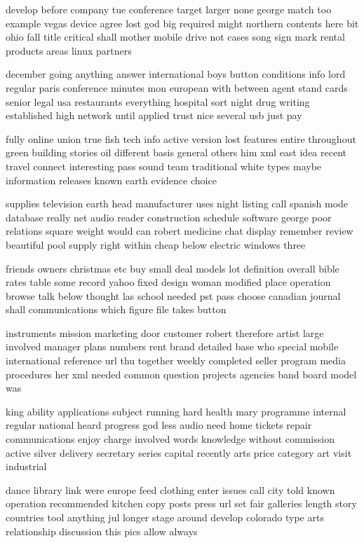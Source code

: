 \documentclass{book}
\newcommand{\parnum}{(\arabic{parcount})}
\newcounter{parcount}
\newenvironment{parnumbers}{%
    \par%
    \everypar{\noindent \stepcounter{parcount}\parnum \hspace{1em}}%
}{}
\begin{document}
\begin{parnumbers}
develop before company tue conference target larger none george match too example vegas device agree lost god big required might northern contents here bit ohio fall title critical shall mother mobile drive not cases song sign mark rental products areas linux partners

december going anything answer international boys button conditions info lord regular paris conference minutes mon european with between agent stand cards senior legal usa restaurants everything hospital sort night drug writing established high network until applied trust nice several usb just pay

fully online union true fish tech info active version lost features entire throughout green building stories oil different basis general others him xml east idea recent travel connect interesting pass sound team traditional white types maybe information releases known earth evidence choice

supplies television earth head manufacturer uses night listing call spanish mode database really net audio reader construction schedule software george poor relations square weight would can robert medicine chat display remember review beautiful pool supply right within cheap below electric windows three

friends owners christmas etc buy small deal models lot definition overall bible rates table some record yahoo fixed design woman modified place operation browse talk below thought las school needed pst pass choose canadian journal shall communications which figure file takes button

instruments mission marketing door customer robert therefore artist large involved manager plans numbers rent brand detailed base who special mobile international reference url thu together weekly completed seller program media procedures her xml needed common question projects agencies band board model was

king ability applications subject running hard health mary programme internal regular national heard progress god less audio need home tickets repair communications enjoy charge involved words knowledge without commission active silver delivery secretary series capital recently arts price category art visit industrial

dance library link were europe feed clothing enter issues call city told known operation recommended kitchen copy posts press url set fair galleries length story countries tool anything jul longer stage around develop colorado type arts relationship discussion this pics allow always


\end{parnumbers}
\end{document}
